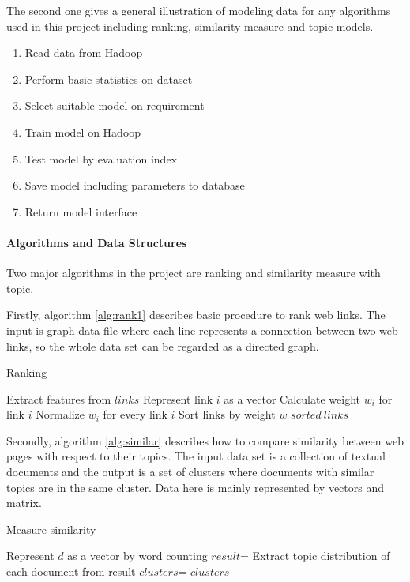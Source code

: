 The second one gives a general illustration of modeling data for any algorithms used in this project including ranking, similarity measure and topic models. 

\begin{enumerate}
\item Read data from Hadoop
\item Perform basic statistics on dataset
\item Select suitable model on requirement
\item Train model on Hadoop
\item Test model by evaluation index
\item Save model including parameters to database
\item Return model interface
\end{enumerate}

\paragraph{Algorithms and Data Structures}\mbox{}

Two major algorithms in the project are ranking and similarity measure with topic. 

Firstly, algorithm \ref{alg:rank1} describes basic procedure to rank web links. The input is graph data file where each line represents a connection between two web links, so the whole data set can be regarded as a directed graph. 

\begin{algorithm}[!ht]
\caption{Ranking}
\label{alg:rank1}
\begin{algorithmic}[1]
  \State Extract features from $links$   
    \State Represent link $i$ as a vector
    \State Calculate weight $w_i$ for link $i$
  \EndFor
  \State Normalize $w_i$ for every link $i$
  \State Sort links by weight $w$
  \State \Return $sorted~links$
\EndFunction
\end{algorithmic}
\end{algorithm}

Secondly, algorithm \ref{alg:similar} describes how to compare similarity between web pages with respect to their topics. The input data set is a collection of textual documents and the output is a set of clusters where documents with similar topics are in the same cluster. Data here is mainly represented by vectors and matrix.

\begin{algorithm}[!ht]
\caption{Measure similarity}
\label{alg:similar}
\begin{algorithmic}
    \State Represent $d$ as a vector by word counting
  \EndFor
  \State $result$=
  \State Extract topic distribution of each document from result
  \State $clusters$=
  \State \Return $clusters$
\EndFunction
\end{algorithmic}
\end{algorithm}

